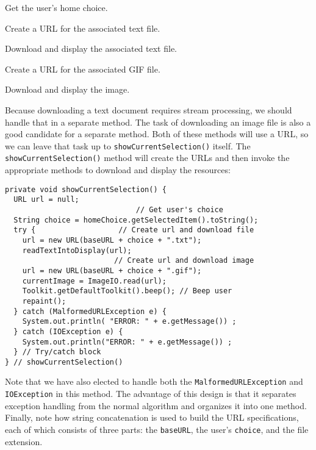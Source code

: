 {\begin{BL}
\item  Get the user's home choice.
\item  Create a URL for the associated text file.
\item  Download and display the associated text file.
\item  Create a URL for the associated GIF file.
\item  Download and display the image.
\end{BL}

\noindent Because downloading a text document requires stream
processing, we should handle that in a separate method.  The task of
downloading an image file is also a good candidate for a separate
method.  Both of these methods will use a URL, so we can leave that
task up to {\tt showCurrent\-Selection()} itself.  The
{\tt showCurrentSelection()} method will create the URLs and then invoke
the appropriate methods to download and display the resources:

\begin{jjjlisting}[28pc]
\begin{lstlisting}
private void showCurrentSelection() {
  URL url = null;
                              // Get user's choice
  String choice = homeChoice.getSelectedItem().toString();     
  try {                   // Create url and download file         
    url = new URL(baseURL + choice + ".txt");
    readTextIntoDisplay(url);          
                         // Create url and download image
    url = new URL(baseURL + choice + ".gif"); 
    currentImage = ImageIO.read(url);
    Toolkit.getDefaultToolkit().beep(); // Beep user
    repaint();
  } catch (MalformedURLException e) {
    System.out.println( "ERROR: " + e.getMessage()) ;
  } catch (IOException e) {
    System.out.println("ERROR: " + e.getMessage()) ;
  } // Try/catch block
} // showCurrentSelection()
\end{lstlisting}
\end{jjjlisting}

\noindent Note that we have also elected to handle both the
{\tt MalformedURLException} and {\tt IOException} in this method.  The
advantage of this design is that it separates exception handling from the
normal algorithm and organizes it into one method.  Finally, note how
string concatenation is used to build the URL specifications,
each of which consists of three parts: the {\tt baseURL}, the
user's {\tt choice}, and the file extension.

}

